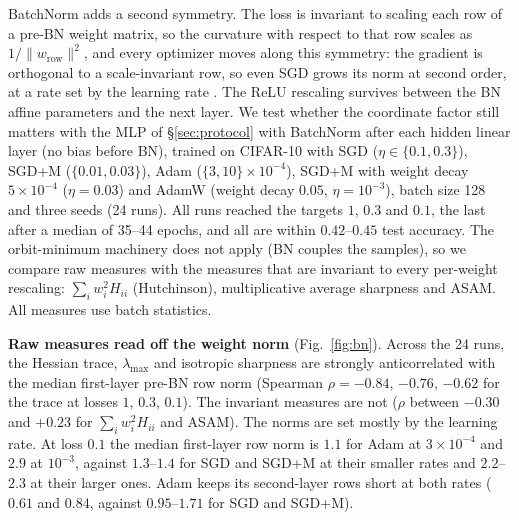 \documentclass[10pt]{article}
\theoremstyle{remark}
\begin{document}
BatchNorm adds a second symmetry. The loss is invariant to scaling each row of a pre-BN weight matrix, so the curvature with respect to that row scales as $1/\|w_{\mathrm{row}}\|^2$, and every optimizer moves along this symmetry: the gradient is orthogonal to a scale-invariant row, so even SGD grows its norm at second order, at a rate set by the learning rate \citep{vanlaarhoven2017l2,hoffer2018norm,arora2019autorate}. The ReLU rescaling survives between the BN affine parameters and the next layer. We test whether the coordinate factor still matters with the MLP of \S\ref{sec:protocol} with BatchNorm after each hidden linear layer (no bias before BN), trained on CIFAR-10 with SGD ($\eta\in\{0.1,0.3\}$), SGD+M ($\{0.01,0.03\}$), Adam ($\{3,10\}\times10^{-4}$), SGD+M with weight decay $5\times10^{-4}$ ($\eta=0.03$) and AdamW (weight decay $0.05$, $\eta=10^{-3}$), batch size 128 and three seeds (24 runs). All runs reached the targets $1$, $0.3$ and $0.1$, the last after a median of 35--44 epochs, and all are within $0.42$--$0.45$ test accuracy. The orbit-minimum machinery does not apply (BN couples the samples), so we compare raw measures with the measures that are invariant to every per-weight rescaling: $\sum_iw_i^2H_{ii}$ (Hutchinson), multiplicative average sharpness and ASAM. All measures use batch statistics.

\textbf{Raw measures read off the weight norm} (Fig.~\ref{fig:bn}). Across the 24 runs, the Hessian trace, $\lambda_{\max}$ and isotropic sharpness are strongly anticorrelated with the median first-layer pre-BN row norm (Spearman $\rho=-0.84$, $-0.76$, $-0.62$ for the trace at losses $1$, $0.3$, $0.1$). The invariant measures are not ($\rho$ between $-0.30$ and $+0.23$ for $\sum_iw_i^2H_{ii}$ and ASAM). The norms are set mostly by the learning rate. At loss $0.1$ the median first-layer row norm is $1.1$ for Adam at $3\times10^{-4}$ and $2.9$ at $10^{-3}$, against $1.3$--$1.4$ for SGD and SGD+M at their smaller rates and $2.2$--$2.3$ at their larger ones. Adam keeps its second-layer rows short at both rates ($0.61$ and $0.84$, against $0.95$--$1.71$ for SGD and SGD+M).
\end{document}
